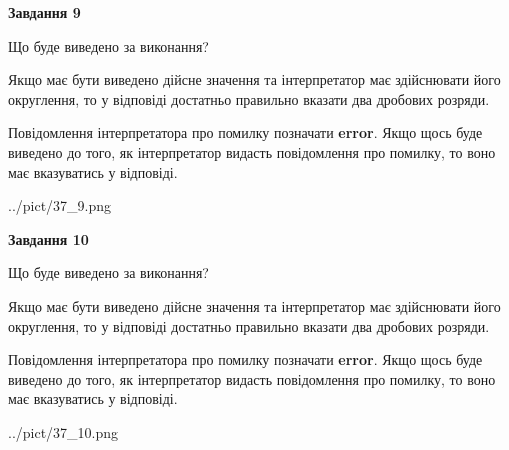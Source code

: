 \documentclass[12pt, ukrainian]{article}
\begin{document}
{\begin {Large}
{\begin {center}\textbf{Завдання 9}\end {center}}\par
Що буде виведено за виконання? \par

Якщо має бути виведено дійсне значення та інтерпретатор має здійснювати його округлення, 
то у відповіді достатньо правильно вказати два дробових розряди.

Повідомлення інтерпретатора про помилку позначати \textbf{error}.
Якщо щось буде виведено до того, як інтерпретатор видасть повідомлення про помилку, 
то воно має вказуватись у відповіді. \par

\begin{center}
	{../pict/37_9.png}
\end{center}
\newpage

{\begin {center}\textbf{Завдання 10}\end {center}}\par
Що буде виведено за виконання? \par

Якщо має бути виведено дійсне значення та інтерпретатор має здійснювати його округлення, 
то у відповіді достатньо правильно вказати два дробових розряди.

Повідомлення інтерпретатора про помилку позначати \textbf{error}.
Якщо щось буде виведено до того, як інтерпретатор видасть повідомлення про помилку, 
то воно має вказуватись у відповіді. \par

\begin{center}
	{../pict/37_10.png}
\end{center}
\newpage

\end {Large}}
\end{document}
